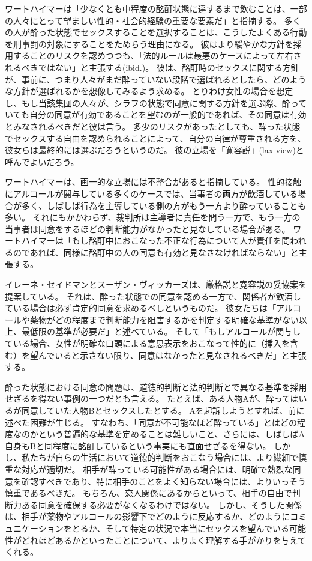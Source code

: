 \documentclass[paper=a4,book,openany]{jlreq}
\begin{document}
ワートハイマーは「少なくとも中程度の酩酊状態に達するまで飲むことは、一部の人々にとって望ましい性的・社会的経験の重要な要素だ」と指摘する\citep[p.251]{wertheimer03:_consen_sexual_relat}。
多くの人が酔った状態でセックスすることを選択することは、こうしたよくある行動を刑事罰の対象にすることをためらう理由になる。
彼はより緩やかな方針を採用することのリスクを認めつつも、「法的ルールは最悪のケースによって左右されるべきではない」と主張する(ibid.)。
彼は、酩酊時のセックスに関する方針が、事前に、つまり人々がまだ酔っていない段階で選ばれるとしたら、どのような方針が選ばれるかを想像してみるよう求める。
とりわけ女性の場合を想定し、もし当該集団の人々が、シラフの状態で同意に関する方針を選ぶ際、酔っていても自分の同意が有効であることを望むのが一般的であれば、その同意は有効とみなされるべきだと彼は言う。
多少のリスクがあったとしても、酔った状態でセックスする自由を認められることによって、自分の自律が尊重される方を、彼女らは最終的には選ぶだろうというのだ。
彼の立場を「寛容説」(lax view)と呼んでよいだろう。

ワートハイマーは、画一的な立場には不整合があると指摘している。
性的接触にアルコールが関与している多くのケースでは、当事者の両方が飲酒している場合が多く、しばしば行為を主導している側の方がもう一方より酔っていることも多い。
それにもかかわらず、裁判所は主導者に責任を問う一方で、もう一方の当事者は同意をするほどの判断能力がなかったと見なしている場合がある。
ワートハイマーは「もし酩酊中におこなった不正な行為について人が責任を問われるのであれば、同様に酩酊中の人の同意も有効と見なさなければならない」と主張する\citep[p.233]{wertheimer03:_consen_sexual_relat}。

イレーネ・セイドマンとスーザン・ヴィッカーズは、厳格説と寛容説の妥協案を提案している。
それは、酔った状態での同意を認める一方で、関係者が飲酒している場合は必ず肯定的同意を求めるべしというものだ。
彼女たちは「アルコールや薬物がどの程度まで判断能力を阻害するかを判定する明確な基準がない以上、最低限の基準が必要だ」と述べている。
そして「もしアルコールが関与している場合、女性が明確な口頭による意思表示をおこなって性的に（挿入を含む）を望んでいると示さない限り、同意はなかったと見なされるべきだ」と主張する\citep[p.486]{seidman05:_secon_wave}。

酔った状態における同意の問題は、道徳的判断と法的判断とで異なる基準を採用せざるを得ない事例の一つだとも言える。
たとえば、ある人物Aが、酔ってはいるが同意していた人物Bとセックスしたとする。
Aを起訴しようとすれば、前に述べた困難が生じる。
すなわち、「同意が不可能なほど酔っている」とはどの程度なのかという普遍的な基準を定めることは難しいこと、さらには、しばしばA自身もBと同程度に酩酊しているという事実にも直面せざるを得ない。
しかし、私たちが自らの生活において道徳的判断をおこなう場合には、より繊細で慎重な対応が適切だ。
相手が酔っている可能性がある場合には、明確で熱烈な同意を確認すべきであり、特に相手のことをよく知らない場合には、よりいっそう慎重であるべきだ。
もちろん、恋人関係にあるからといって、相手の自由で判断力ある同意を確保する必要がなくなるわけではない。
しかし、そうした関係は、相手が薬物やアルコールの影響下でどのように反応するか、どのようにコミュニケーションをとるか、そして特定の状況で本当にセックスを望んでいる可能性がどれほどあるかといったことについて、よりよく理解する手がかりを与えてくれる。
\end{document}
